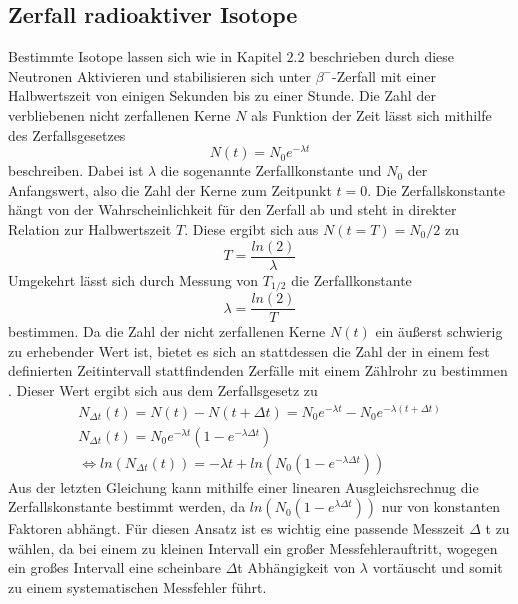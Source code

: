 \subsection{Zerfall radioaktiver Isotope}
Bestimmte Isotope lassen sich wie in Kapitel $2.2$ beschrieben durch diese Neutronen Aktivieren und 
stabilisieren sich unter $\beta^-$-Zerfall mit einer Halbwertszeit von einigen Sekunden bis zu einer 
Stunde. Die Zahl der verbliebenen nicht zerfallenen Kerne $N$ als Funktion der Zeit lässt sich mithilfe 
des Zerfallsgesetzes
\begin{equation}
    \label{eq:gesetz}
N(t)=N_0e^{-\lambda t}
\end{equation}
beschreiben. Dabei ist $\lambda$ die sogenannte Zerfallkonstante und $N_0$ der Anfangswert, also die Zahl 
der Kerne zum Zeitpunkt $t=0$. Die Zerfallskonstante hängt von der Wahrscheinlichkeit für den Zerfall ab 
und steht in direkter Relation zur Halbwertszeit $T$. Diese ergibt sich aus $N(t=T)=N_0/2$ zu
\begin{equation}
    \label{eq:halb}
T=\frac{ln(2)}{\lambda}
\end{equation}
Umgekehrt lässt sich durch Messung von $T_{1/2}$ die Zerfallkonstante
\begin{equation*}
\lambda=\frac{ln(2)}{T}
\end{equation*}
bestimmen. Da die Zahl der nicht zerfallenen Kerne $N(t)$ ein äußerst schwierig zu erhebender Wert ist, 
bietet es sich an  stattdessen die Zahl der in einem fest definierten Zeitintervall stattfindenden Zerfälle 
mit einem Zählrohr zu bestimmen . Dieser Wert ergibt sich aus dem Zerfallsgesetz zu
\begin{gather}
N_{\Delta t}(t)=N(t)-N(t + \Delta t)=N_0e^{-\lambda t}-N_0e^{-\lambda (t+\Delta t)} \\
\label{eq:zerfallsgesetz}
N_{\Delta t}(t)=N_0e^{-\lambda t}(1-e^{-\lambda \Delta t} ) \\
\iff ln(N_{\Delta t}(t))=-\lambda t + ln(N_0(1-e^{-\lambda \Delta t}))
\end{gather}
Aus der letzten Gleichung kann mithilfe einer linearen Ausgleichsrechnug die Zerfallskonstante bestimmt 
werden, da $ln(N_0(1-e^{\lambda \Delta t}))$ nur von konstanten Faktoren abhängt. Für diesen Ansatz ist 
es wichtig eine passende Messzeit $\Delta$ t zu wählen, da bei einem zu kleinen Intervall ein großer 
Messfehlerauftritt, wogegen ein großes Intervall eine scheinbare $\Delta$t Abhängigkeit von $\lambda$ 
vortäuscht und somit zu einem systematischen Messfehler führt. \\
